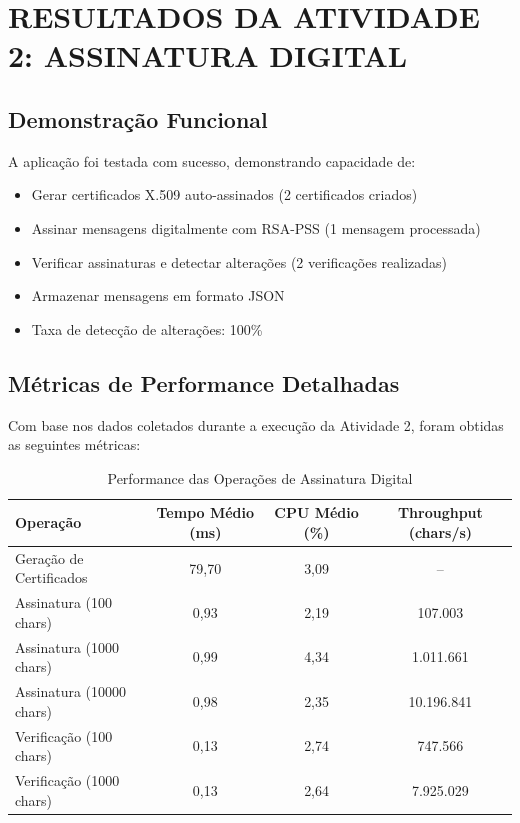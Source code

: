 \documentclass[12pt,a4paper,oneside]{article}
\begin{document}
\section{RESULTADOS DA ATIVIDADE 2: ASSINATURA DIGITAL}

\subsection{Demonstração Funcional}

A aplicação foi testada com sucesso, demonstrando capacidade de:

\begin{itemize}
    \item Gerar certificados X.509 auto-assinados (2 certificados criados)
    \item Assinar mensagens digitalmente com RSA-PSS (1 mensagem processada)
    \item Verificar assinaturas e detectar alterações (2 verificações realizadas)
    \item Armazenar mensagens em formato JSON
    \item Taxa de detecção de alterações: 100\%
\end{itemize}

\subsection{Métricas de Performance Detalhadas}

Com base nos dados coletados durante a execução da Atividade 2, foram obtidas as seguintes métricas:

\begin{table}[H]
\centering
\caption{Performance das Operações de Assinatura Digital}
\label{tab:signature_performance}
\begin{tabular}{lccc}
\toprule
\textbf{Operação} & \textbf{Tempo Médio (ms)} & \textbf{CPU Médio (\%)} & \textbf{Throughput (chars/s)} \\
\midrule
Geração de Certificados & 79,70 & 3,09 & -- \\
Assinatura (100 chars) & 0,93 & 2,19 & 107.003 \\
Assinatura (1000 chars) & 0,99 & 4,34 & 1.011.661 \\
Assinatura (10000 chars) & 0,98 & 2,35 & 10.196.841 \\
Verificação (100 chars) & 0,13 & 2,74 & 747.566 \\
Verificação (1000 chars) & 0,13 & 2,64 & 7.925.029 \\
\bottomrule
\end{tabular}
\end{table}
\end{document}
